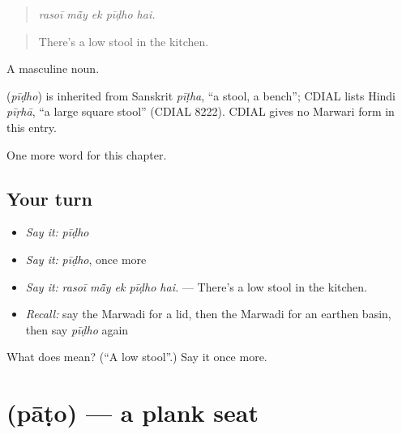 \begin{quote}
    
\end{quote}

\begin{quote}
\emph{rasoī mā̃y ek pīḍho hai.}
\end{quote}

\begin{quote}
There's a low stool in the kitchen.
\end{quote}

A masculine noun.

\begin{cousinweb}
\textbf{} (\emph{pīḍho}) is inherited from Sanskrit \emph{pīṭha}, \textquotedblleft{}a stool, a bench\textquotedblright{}; CDIAL lists Hindi \emph{pīṛhā}, \textquotedblleft{}a large square stool\textquotedblright{} (CDIAL 8222). CDIAL gives no Marwari form in this entry.
\end{cousinweb}

\begin{grammarlens}[title={What you've built}]
One more word for this chapter.
\end{grammarlens}

\subsection*{Your turn}
\begin{itemize}
\raggedright
  \item \emph{Say it:} \emph{pīḍho}
  \item \emph{Say it:} \emph{pīḍho}, once more
  \item \emph{Say it:} \emph{rasoī mā̃y ek pīḍho hai.} — There's a low stool in the kitchen.
  \item \emph{Recall:} say the Marwadi for a lid, then the Marwadi for an earthen basin, then say \emph{pīḍho} again
\end{itemize}

\begin{tcolorbox}[breakable,colback=teal!4,colframe=teal!35!black,title={Before you move on}]
What does  mean? (\textquotedblleft{}A low stool\textquotedblright{}.) Say it once more.
\end{tcolorbox}
\section[\texorpdfstring{\mw{पाटो} (pāṭo)}{पाटो (pāṭo)}]{ (pāṭo) — a plank seat}

